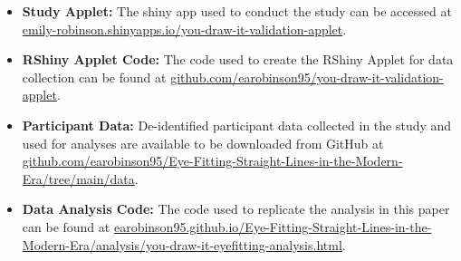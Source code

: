 \documentclass[12pt]{article}
\providecommand{\tightlist}{%
  \setlength{\itemsep}{0pt}\setlength{\parskip}{0pt}}
\begin{document}
\begin{itemize}
\tightlist
\item
  \textbf{Study Applet:} The shiny app used to conduct the study can be
  accessed at
  \href{https://emily-robinson.shinyapps.io/you-draw-it-validation-applet/}{emily-robinson.shinyapps.io/you-draw-it-validation-applet}.
\item
  \textbf{RShiny Applet Code:} The code used to create the RShiny Applet
  for data collection can be found at
  \href{https://github.com/earobinson95/you-draw-it-validation-applet}{github.com/earobinson95/you-draw-it-validation-applet}.
\item
  \textbf{Participant Data:} De-identified participant data collected in
  the study and used for analyses are available to be downloaded from
  GitHub at
  \href{https://github.com/earobinson95/Eye-Fitting-Straight-Lines-in-the-Modern-Era/tree/main/data}{github.com/earobinson95/Eye-Fitting-Straight-Lines-in-the-Modern-Era/tree/main/data}.
\item
  \textbf{Data Analysis Code:} The code used to replicate the analysis
  in this paper can be found at
  \href{https://earobinson95.github.io/Eye-Fitting-Straight-Lines-in-the-Modern-Era/analysis/you-draw-it-eyefitting-analysis.html}{earobinson95.github.io/Eye-Fitting-Straight-Lines-in-the-Modern-Era/analysis/you-draw-it-eyefitting-analysis.html}.
\end{itemize}



\end{document}
